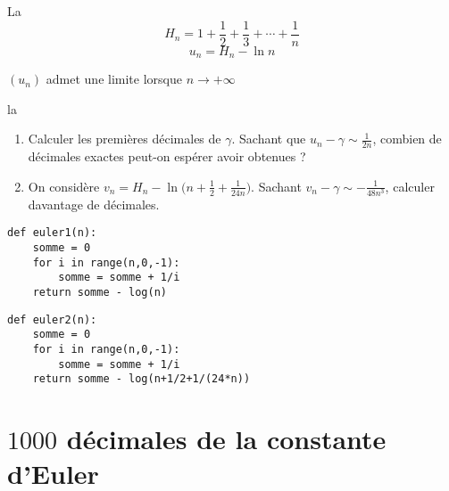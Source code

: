  
\begin{frame}
La 
$$H_n = 1+\frac{1}{2}+\frac{1}{3}+\cdots + \frac{1}{n}$$
\pause
\vspace*{-2ex}
$$u_n = H_n - \ln n$$
\pause
\centerline{$(u_n)$ admet une limite lorsque $n\to+\infty$}

\centerline{la }

\bigskip

\pause

\begin{tp}
\begin{enumerate}
  \item Calculer les premières décimales de $\gamma$. Sachant que $u_n - \gamma \sim \frac{1}{2n}$, combien de
  décimales exactes peut-on espérer avoir obtenues ?
  
  \item On considère $v_n = H_n -\ln\big(n+\frac 12 + \frac{1}{24n} \big)$. Sachant $v_n - \gamma \sim -\frac{1}{48n^3}$, calculer davantage
  de décimales.
\end{enumerate}  
\end{tp}

\end{frame}


\begin{frame}[fragile]

\begin{algo}[euler.py (1)]
\begin{lstlisting}
def euler1(n):
    somme = 0
    for i in range(n,0,-1):
        somme = somme + 1/i
    return somme - log(n)
\end{lstlisting}  
\end{algo}

\pause

\begin{algo}[euler.py (2)]
\begin{lstlisting}
def euler2(n):
    somme = 0
    for i in range(n,0,-1):
        somme = somme + 1/i
    return somme - log(n+1/2+1/(24*n))
\end{lstlisting}  
\end{algo}

\end{frame}


\section{$1000$ décimales de la constante d'Euler}

